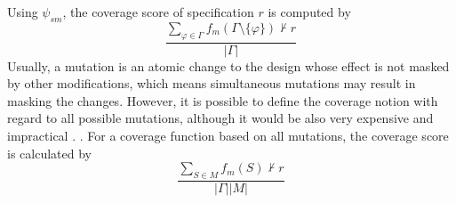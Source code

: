 Using $\psi_{sm}$, the coverage score of specification $r$ is computed by $$\frac{\sum_{\varphi \in \Gamma} f_m (\Gamma \setminus \{ \varphi \}) \nvdash r}{|\Gamma|}$$
Usually, a mutation is an atomic change to the design whose effect is not masked by other modifications, which means simultaneous mutations may result in masking the changes. However,
it is possible to define the coverage notion with regard to all possible mutations, although it would be also very expensive and impractical \cite{chockler2001practical}. .
For a coverage function based on all mutations, the coverage score is calculated by
$$ \frac{\sum_{S \in M} f_m (S) \nvdash r}{|\Gamma| |M|}$$
\fi




